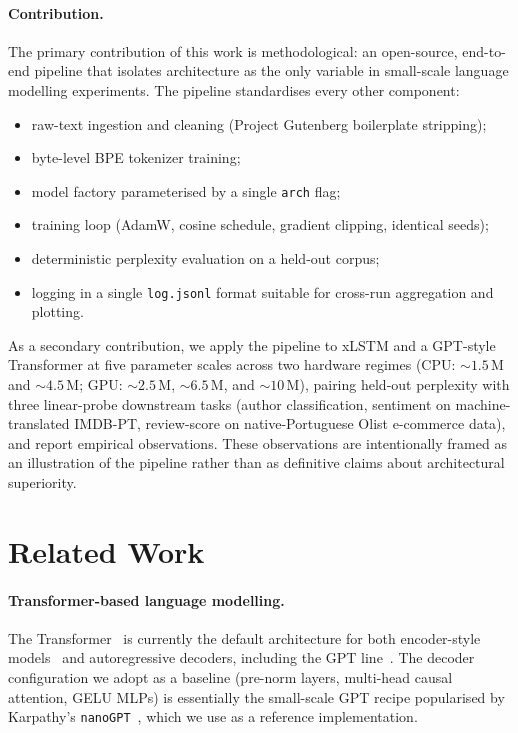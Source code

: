 \documentclass[11pt]{article}
\begin{document}
\paragraph{Contribution.} The primary contribution of this work is
methodological: an open-source, end-to-end pipeline that isolates
architecture as the only variable in small-scale language modelling
experiments. The pipeline standardises every other component:
\begin{itemize}[leftmargin=1.2em, itemsep=0pt, topsep=0pt]
  \item raw-text ingestion and cleaning (Project Gutenberg boilerplate
        stripping);
  \item byte-level BPE tokenizer training;
  \item model factory parameterised by a single \texttt{arch} flag;
  \item training loop (AdamW, cosine schedule, gradient clipping,
        identical seeds);
  \item deterministic perplexity evaluation on a held-out corpus;
  \item logging in a single \texttt{log.jsonl} format suitable for
        cross-run aggregation and plotting.
\end{itemize}
As a secondary contribution, we apply the pipeline to xLSTM and a
GPT-style Transformer at five parameter scales across two hardware
regimes (CPU: $\sim$$1.5$\,M and $\sim$$4.5$\,M; GPU: $\sim$$2.5$\,M,
$\sim$$6.5$\,M, and $\sim$$10$\,M), pairing held-out perplexity with
three linear-probe downstream tasks (author classification, sentiment
on machine-translated IMDB-PT, review-score on native-Portuguese Olist
e-commerce data), and report empirical observations. These
observations are intentionally framed as an illustration of the
pipeline rather than as definitive claims about architectural
superiority.

\section{Related Work}

\paragraph{Transformer-based language modelling.}
The Transformer~\cite{vaswani2017} is currently the default architecture
for both encoder-style models~\cite{devlin2019} and autoregressive
decoders, including the GPT line~\cite{radford2019}. The decoder
configuration we adopt as a baseline (pre-norm layers, multi-head causal
attention, GELU MLPs) is essentially the small-scale GPT recipe popularised
by Karpathy's \texttt{nanoGPT}~\cite{nanogpt}, which we use as a reference
implementation.
\end{document}
